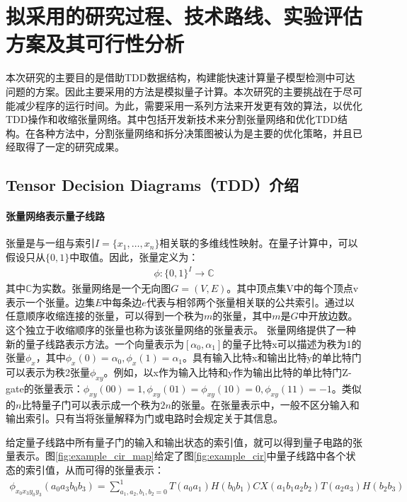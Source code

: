 \chapter{拟采用的研究过程、技术路线、实验评估方案及其可行性分析}
本次研究的主要目的是借助TDD数据结构，构建能快速计算量子模型检测中可达问题的方案。因此主要采用的方法是模拟量子计算。本次研究的主要挑战在于尽可能减少程序的运行时间。为此，需要采用一系列方法来开发更有效的算法，以优化TDD操作和收缩张量网络。其中包括开发新技术来分割张量网络和优化TDD结构。在各种方法中，分割张量网络和拆分决策图被认为是主要的优化策略，并且已经取得了一定的研究成果。
\section{Tensor Decision Diagrams（TDD）介绍}
\subsubsection{张量网络表示量子线路}
张量是与一组与索引\(I=\{x_1,\ldots,x_n\}\)相关联的多维线性映射。在量子计算中，可以假设只从\(\{0,1\}\)中取值。因此，张量定义为：
\begin{align}
    \phi :{\{0,1\}}^I\rightarrow\mathbb{C}
\end{align}
其中\(\mathbb{C}\)为实数。张量网络是一个无向图\(G=\left(V,E\right)\)。其中顶点集V中的每个顶点v表示一个张量。边集\(E\)中每条边\(e\)代表与相邻两个张量相关联的公共索引。通过以任意顺序收缩连接的张量，可以得到一个秩为\(m\)的张量，其中\(m\)是$G$中开放边数。这个独立于收缩顺序的张量也称为该张量网络的张量表示\citep{biamonte2019lectures}。
张量网络提供了一种新的量子线路表示方法\citep{pednault2017breaking}。一个向量表示为$[\alpha_0,\alpha_1]$的量子比特x可以描述为秩为1的张量$\phi_x$，其中$\phi_x\left(0\right)=\alpha_0, \phi_x\left(1\right)=\alpha_1$。具有输入比特x和输出比特y的单比特门可以表示为秩2张量$\phi_{xy}$。例如，以x作为输入比特和y作为输出比特的单比特门Z-gate的张量表示：$\phi_{xy}\left(00\right)=1,\phi_{xy}\left(01\right)=\phi_{xy}\left(10\right)=0,\phi_{xy}\left(11\right)=-1$。类似的$n$比特量子门可以表示成一个秩为$2n$的张量。在张量表示中，一般不区分输入和输出索引。只有当将张量解释为门或电路时会规定关于其信息。

给定量子线路中所有量子门的输入和输出状态的索引值，就可以得到量子电路的张量表示。图\ref{fig:example_cir_map}给定了图\ref{fig:example_cir}中量子线路中各个状态的索引值，从而可得的张量表示：
\begin{align}
\phi_{x_0x_3y_0y_3}\left(a_0a_3b_0b_3\right)=\sum_{a_1,a_2,b_1,b_2=0}^{1}T\left(a_0a_1\right)H\left(b_0b_1\right)CX\left(a_1b_1a_2b_2\right)T\left(a_2a_3\right)H\left(b_2b_3\right)
\end{align}

